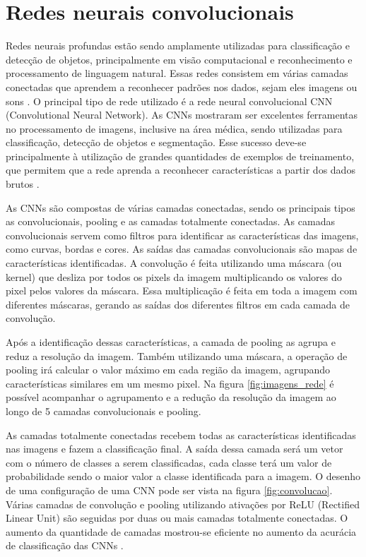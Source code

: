 \documentclass[conference]{IEEEtran}
\begin{document}

\section{Redes neurais convolucionais}


Redes neurais profundas estão sendo amplamente utilizadas para classificação e detecção de objetos, principalmente em visão computacional e reconhecimento e processamento de linguagem natural. Essas redes consistem em várias camadas conectadas que aprendem a reconhecer padrões nos dados, sejam eles imagens ou sons \cite{LeCun2015}. O principal tipo de rede utilizado é a rede neural convolucional CNN (Convolutional Neural Network). As CNNs mostraram ser excelentes ferramentas no processamento de imagens, inclusive na área médica, sendo utilizadas para classificação, detecção de objetos e segmentação. Esse sucesso deve-se principalmente à utilização de grandes quantidades de exemplos de treinamento, que permitem que a rede aprenda a reconhecer características a partir dos dados brutos \cite{greenspan2016}. %

As CNNs são compostas de várias camadas conectadas, sendo os principais tipos as convolucionais, pooling e as camadas totalmente conectadas. As camadas convolucionais servem como filtros para identificar as características das imagens, como curvas, bordas e cores. As saídas das camadas convolucionais são mapas de características identificadas. A convolução é feita utilizando uma máscara (ou kernel) que desliza por todos os pixels da imagem multiplicando os valores do pixel pelos valores da máscara. Essa multiplicação é feita em toda a imagem com diferentes máscaras, gerando as saídas dos diferentes filtros em cada camada de convolução.

Após a identificação dessas características, a camada de pooling as agrupa e reduz a resolução da imagem. Também utilizando uma máscara, a operação de pooling irá calcular o valor máximo em cada região da imagem, agrupando características similares em um mesmo pixel. Na figura \ref{fig:imagens_rede} é possível acompanhar o agrupamento e a redução da resolução da imagem ao longo de 5 camadas convolucionais e pooling.

As camadas totalmente conectadas recebem todas as características identificadas nas imagens e fazem a classificação final. A saída dessa camada será um vetor com o número de classes a serem classificadas, cada classe terá um valor de probabilidade sendo o maior valor a classe identificada para a imagem. O desenho de uma configuração de uma CNN pode ser vista na figura \ref{fig:convolucao}. Várias camadas de convolução e pooling utilizando ativações por ReLU (Rectified Linear Unit) são seguidas por duas ou mais camadas totalmente conectadas. O aumento da quantidade de camadas mostrou-se eficiente no aumento da acurácia de classificação das CNNs \cite{simonyan2014}.
\end{document}
